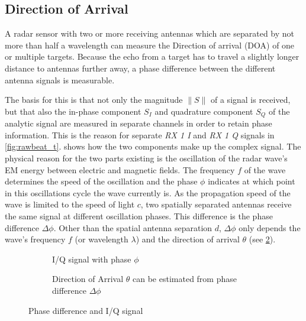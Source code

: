 \subsection{Direction of Arrival}\label{direction-of-arrival}

A radar sensor with two or more receiving antennas which are separated
by not more than half a wavelength can measure the Direction of arrival
(DOA) of one or multiple targets. Because the echo from a target has to
travel a slightly longer distance to antennas further away, a phase
difference between the different antenna signals is measurable.

The basis for this is that not only the magnitude $\|S\|$ of a signal is received, but that also the in-phase component $S_I$ and quadrature component $S_Q$ of the analytic signal are measured in separate channels in order to retain phase information. This is the reason for separate \textit{RX 1 I} and \textit{RX 1 Q} signals in \cref{fig:rawbeat_t}.  shows how the two components make up the complex signal. The physical reason for the two parts existing is the oscillation of the radar wave's EM energy between electric and magnetic fields. The frequency $f$ of the wave determines the speed of the oscillation and the phase $\phi$ indicates at which point in this oscillations cycle the wave currently is. As the propagation speed of the wave is limited to the speed of light $c$, two spatially separated antennas receive the same signal at different oscillation phases. This difference is the phase difference $\Delta\phi$. Other than the spatial antenna separation $d$, $\Delta\phi$ only depends the wave's frequency $f$ (or wavelength $\lambda$) and the direction of arrival $\theta$ (see \cref{fig:doa}).

\begin{figure}[htbp]
    \begin{subfigure}[t]{0.5\textwidth}
        \centering
        \def\svgscale{1}
        
        \caption{I/Q signal with phase $\phi$}
        \label{fig:iq}
    \end{subfigure}
    \begin{subfigure}[t]{0.5\textwidth}
        \centering
        \def\svgscale{1}
        
        \caption{Direction of Arrival \(\theta\) can be estimated from phase difference \(\Delta\phi\)}
        \label{fig:doa}
    \end{subfigure}
    \caption{Phase difference and I/Q signal}
    \label{fig:doiq}
\end{figure}

